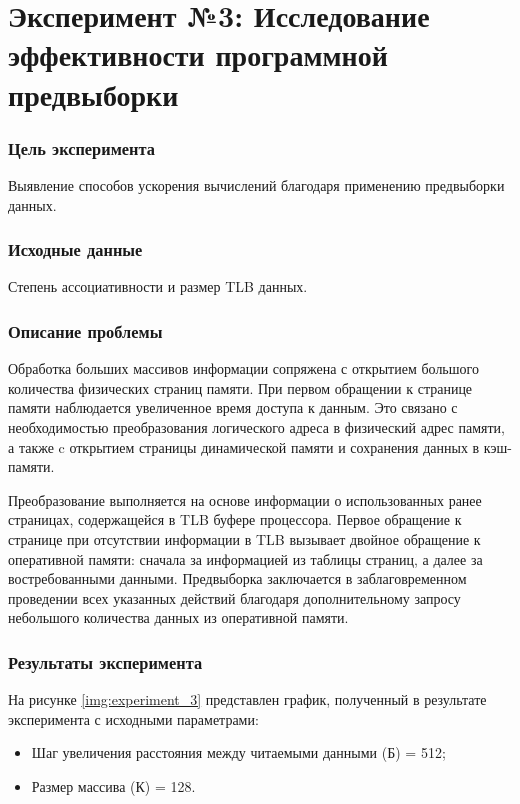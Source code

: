 \chapter*{\textbf{Эксперимент №3: Исследование эффективности программной предвыборки}}

\subsection*{\textbf{Цель эксперимента}}
Выявление способов ускорения вычислений благодаря применению предвыборки данных. 

\subsection*{\textbf{Исходные данные}}
Степень ассоциативности и размер TLB данных.

\subsection*{\textbf{Описание проблемы}}
Обработка больших массивов информации сопряжена с открытием большого количества физических страниц памяти. При первом обращении к странице памяти наблюдается увеличенное время доступа к данным. Это связано с необходимостью преобразования логического адреса в физический адрес памяти, а также c открытием страницы динамической памяти и сохранения данных в кэш-памяти.

Преобразование выполняется на основе информации о использованных ранее страницах, содержащейся в TLB буфере процессора. Первое обращение к странице при отсутствии информации в TLB вызывает двойное обращение к оперативной памяти: сначала за информацией из таблицы страниц, а далее за востребованными данными. Предвыборка заключается в заблаговременном проведении всех указанных действий благодаря дополнительному запросу небольшого количества данных из оперативной памяти. 

\subsection*{\textbf{Результаты эксперимента}}
На рисунке \ref{img:experiment_3} представлен график, полученный в результате эксперимента с исходными параметрами:
\begin{itemize}
	\item Шаг увеличения расстояния между читаемыми данными
	(Б) = 512;
	\item Размер массива (К) = 128.
\end{itemize}


